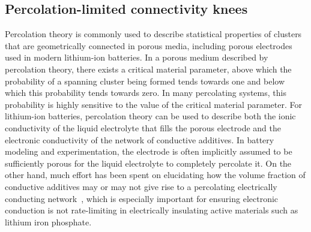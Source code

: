\documentclass[journal=jpclcd,manuscript=article]{achemso}
\begin{document}
\subsection{Percolation-limited connectivity knees}

Percolation theory \cite{essam_percolation_1980, stauffer_introduction_1994} is commonly used to describe statistical properties of clusters that are geometrically connected in porous media, including porous electrodes used in modern lithium-ion batteries\cite{ferguson_nonequilibrium_2012}. In a porous medium described by percolation theory, there exists a critical material parameter, above which the probability of a spanning cluster being formed tends towards one and below which this probability tends towards zero.\cite{ferguson_nonequilibrium_2012} In many percolating systems, this probability is highly sensitive to the value of the critical material parameter. For lithium-ion batteries, percolation theory can be used to describe both the ionic conductivity of the liquid electrolyte that fills the porous electrode and the electronic conductivity of the network of conductive additives. In battery modeling and experimentation, the electrode is often implicitly assumed to be sufficiently porous for the liquid electrolyte to completely percolate it. On the other hand, much effort has been spent on elucidating how the volume fraction of conductive additives may or may not give rise to a percolating electrically conducting network~\cite{chen_selection_2007, li_effects_2015, cerbelaud_understanding_2015, guzman_improved_2017}, which is especially important for ensuring electronic conduction is not rate-limiting in electrically insulating active materials such as lithium iron phosphate.\cite{li_effects_2015, guzman_improved_2017}
\end{document}
